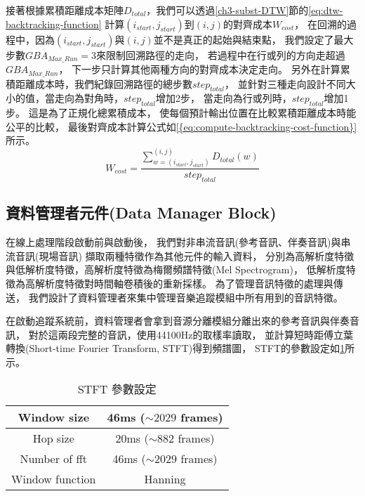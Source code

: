 \documentclass[class=NCU_thesis, crop=false]{standalone}
\begin{document}
接著根據累積距離成本矩陣$D_{total}$，我們可以透過\ref{ch3-subst-DTW}節的\cref{eq:dtw-backtracking-function}
計算$(i_{start}, j_{start})$到$(i, j)$的對齊成本$W_{cost}$，
在回溯的過程中，因為$(i_{start}, j_{start})$與$(i, j)$並不是真正的起始與結束點，
我們設定了最大步數$GBA_{Max\_Run}=3$來限制回溯路徑的走向，
若過程中在行或列的方向走超過$GBA_{Max\_Run}$，
下一步只計算其他兩種方向的對齊成本決定走向。
另外在計算累積距離成本時，我們紀錄回溯路徑的總步數$step_{total}$，
並針對三種走向設計不同大小的值，當走向為對角時，$step_{total}$增加2步，
當走向為行或列時，$step_{total}$增加1步。
這是為了正規化總累積成本，
使每個預計輸出位置在比較累積距離成本時能公平的比較，
最後對齊成本計算公式如\cref{{eq:compute-backtracking-cost-function}}所示。
\begin{equation}
    \label{eq:compute-backtracking-cost-function}
    W_{cost} = \frac{\sum_{w = (i_{start}, j_{start})}^{(i, j)}D_{total}(w)}{step_{total}} 
\end{equation}



\subsection{資料管理者元件(Data Manager Block)} \label{ch3-subst-data-manager}
在線上處理階段啟動前與啟動後，
我們對非串流音訊(參考音訊、伴奏音訊)與串流音訊(現場音訊)
擷取兩種特徵作為其他元件的輸入資料，
分別為高解析度特徵與低解析度特徵，高解析度特徵為梅爾頻譜特徵(Mel Spectrogram)，
低解析度特徵為高解析度特徵對時間軸卷積後的重新採樣。
為了管理音訊特徵的處理與傳送，
我們設計了資料管理者來集中管理音樂追蹤模組中所有用到的音訊特徵。

在啟動追蹤系統前，資料管理者會拿到音源分離模組分離出來的參考音訊與伴奏音訊，
對於這兩段完整的音訊，使用44100Hz的取樣率讀取，
並計算短時距傅立葉轉換(Short-time Fourier Transform, STFT)得到頻譜圖，
STFT的參數設定如\cref{table:table-stft-parameter-setting}所示。

\begin{table}[h]
    \centering
    \caption{STFT 參數設定}
    \label{table:table-stft-parameter-setting}
    \begin{tabular}{|c|c|}
        \hline
        \multicolumn{1}{|c|}{Window size} & \multicolumn{1}{|c|}{46ms ($\sim 2029$ frames)}\\
        \hline
        Hop size & 20ms ($\sim 882$ frames)\\
        \hline
        Number of fft & 46ms ($\sim 2029$ frames)\\
        \hline
        Window function & Hanning \\
        \hline
    \end{tabular}
\end{table}
\end{document}
